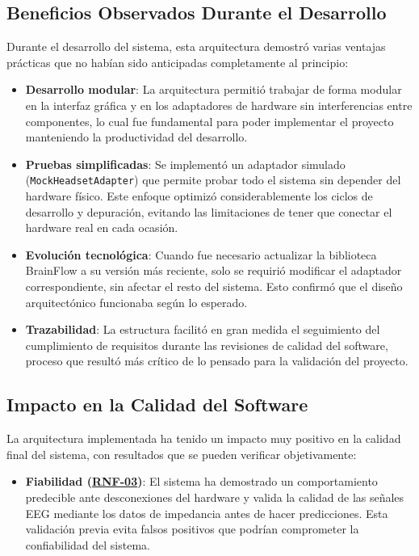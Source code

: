 \begin{enumerate}
\newpage
\subsection{Beneficios Observados Durante el Desarrollo}

Durante el desarrollo del sistema, esta arquitectura demostró varias ventajas prácticas que no habían sido anticipadas completamente al principio:

\begin{itemize}
    \item \textbf{Desarrollo modular}: La arquitectura permitió trabajar de forma modular en la interfaz gráfica y en los adaptadores de hardware sin interferencias entre componentes, lo cual fue fundamental para poder implementar el proyecto manteniendo la productividad del desarrollo.
    
    \item \textbf{Pruebas simplificadas}: Se implementó un adaptador simulado (\texttt{MockHeadsetAdapter}) que permite probar todo el sistema sin depender del hardware físico. Este enfoque optimizó considerablemente los ciclos de desarrollo y depuración, evitando las limitaciones de tener que conectar el hardware real en cada ocasión.
    
    \item \textbf{Evolución tecnológica}: Cuando fue necesario actualizar la biblioteca BrainFlow a su versión más reciente, solo se requirió modificar el adaptador correspondiente, sin afectar el resto del sistema. Esto confirmó que el diseño arquitectónico funcionaba según lo esperado.
    
    \item \textbf{Trazabilidad}: La estructura facilitó en gran medida el seguimiento del cumplimiento de requisitos durante las revisiones de calidad del software, proceso que resultó más crítico de lo pensado para la validación del proyecto.
\end{itemize}

\subsection{Impacto en la Calidad del Software}

La arquitectura implementada ha tenido un impacto muy positivo en la calidad final del sistema, con resultados que se pueden verificar objetivamente:

\begin{itemize}
    \item \textbf{Fiabilidad (\hyperref[rnf-03]{RNF-03})}: El sistema ha demostrado un comportamiento predecible ante desconexiones del hardware y valida la calidad de las señales EEG mediante los datos de impedancia antes de hacer predicciones. Esta validación previa evita falsos positivos que podrían comprometer la confiabilidad del sistema.
    

\end{itemize}
\end{enumerate}

